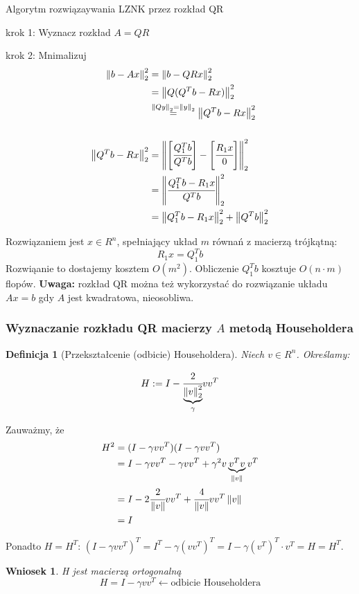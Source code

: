 \documentclass[hidelinks,a4paper,fleqn]{article}
\newcommand{\la}{\leftarrow}
\newcommand{\norm}[1]{\left\lVert#1\right\rVert}
\newtheorem{wniosek}{Wniosek}
\newtheorem{defi}{Definicja}
\begin{document}
Algorytm rozwiązaywania LZNK przez rozkład QR


krok 1: Wyznacz rozkład $A = QR$

krok 2: Mnimalizuj \begin{align*}
\norm{b - Ax}_2^2 &= \norm{b - QRx}^2_2 \\
& = \norm{Q(Q^Tb - Rx)}_2^2 \\
& \stackrel{\norm{Q y}_2 = \norm{y}_2}{=} \norm{Q^Tb - Rx}_2^2 \\
\\
 \norm{Q^Tb - Rx}_2^2 & = \norm{\left[\cfrac{Q_1^Tb}{Q^Tb}\right] - \left[\cfrac{R_1x}{0}\right]}_2^2 \\
 & = \norm{\cfrac{Q_1^Tb - R_1x}{Q^T b}}_2^2 \\
 & = \norm{Q_1^Tb - R_1x}_2^2 + \norm{Q^T b}_2^2
\end{align*}

Rozwiązaniem jest $x \in R^n$, spełniający układ $m$ równań z macierzą trójkątną:
\[
	R_1x = Q_1^Tb
\]
Rozwiąanie to dostajemy kosztem $O(m^2)$. Obliczenie $Q_1^Tb$ kosztuje $O(n \cdot m)$ flopów. \textbf{Uwaga: }rozkład QR można też wykorzystać do rozwiązanie układu $Ax=b$ gdy $A$ jest kwadratowa, nieosobliwa.

\subsubsection{Wyznaczanie rozkładu QR macierzy $A$ metodą Householdera}

\begin{defi}[Przekształcenie (odbicie) Householdera] 
Niech $v \in R^n$. Określamy:
	
	\[
		H := I - \cfrac{2}{\underbrace{\norm{v}_2^2}_{\gamma}}vv^T
	\]
\end{defi}

Zauważmy, że 
\begin{align*}
H^2 & = (I - \gamma vv^T)(I - \gamma vv^T) \\
& = I - \gamma vv^T - \gamma vv^T + \gamma^2v\underbrace{v^Tv}_{\norm{v}}v^T \\
& = I - 2 \cfrac{2}{\norm{v}}v v^T + \cfrac{4}{\norm{v}}  vv^T \norm{v} \\
& = I
\end{align*}

Ponadto $H = H^T$: $(I - \gamma vv^T)^T = I^T - \gamma(vv^T)^T = I - \gamma(v^T)^T \cdot v^T = H = H^T$.

\begin{wniosek}H jest macierzą ortogonalną
	\[
		H = I - \gamma vv^T \la \textrm{odbicie Householdera}
	\]
\end{wniosek}
\end{document}
